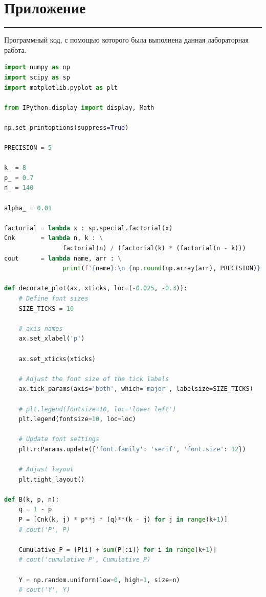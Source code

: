 \documentclass[a4paper, 14pt]{extarticle}
\begin{document}

\newpage

\section*{Приложение}\vspace{-20pt}\rule{\linewidth}{0.1mm}

Программный код, с помощью которого была выполнена данная лабораторная работа.\\

\begin{center}
    \begin{lstlisting}[language=Python]
import numpy as np
import scipy as sp
import matplotlib.pyplot as plt

from IPython.display import display, Math

np.set_printoptions(suppress=True)

PRECISION = 5

k_ = 8
p_ = 0.7
n_ = 140

alpha_ = 0.01

factorial = lambda x : sp.special.factorial(x)
Cnk       = lambda n, k : \
                factorial(n) / (factorial(k) * (factorial(n - k)))
cout      = lambda name, arr : \
                print(f'{name}:\n {np.round(np.array(arr), PRECISION)}')

def decorate_plot(ax, xticks, loc=(-0.025, -0.3)):
    # Define font sizes
    SIZE_TICKS = 10

    # axis names
    ax.set_xlabel('p')

    ax.set_xticks(xticks)

    # Adjust the font size of the tick labels
    ax.tick_params(axis='both', which='major', labelsize=SIZE_TICKS)

    # plt.legend(fontsize=10, loc='lower left')
    plt.legend(fontsize=10, loc=loc)

    # Update font settings
    plt.rcParams.update({'font.family': 'serif', 'font.size': 12})

    # Adjust layout
    plt.tight_layout()

def B(k, p, n):
    q = 1 - p
    P = [Cnk(k, j) * p**j * (q)**(k - j) for j in range(k+1)]
    # cout('P', P)

    Cumulative_P = [P[i] + sum(P[:i]) for i in range(k+1)]
    # cout('cumulative P', Cumulative_P)

    Y = np.random.uniform(low=0, high=1, size=n)
    # cout('Y', Y)


\end{lstlisting}
\end{center}
\end{document}
